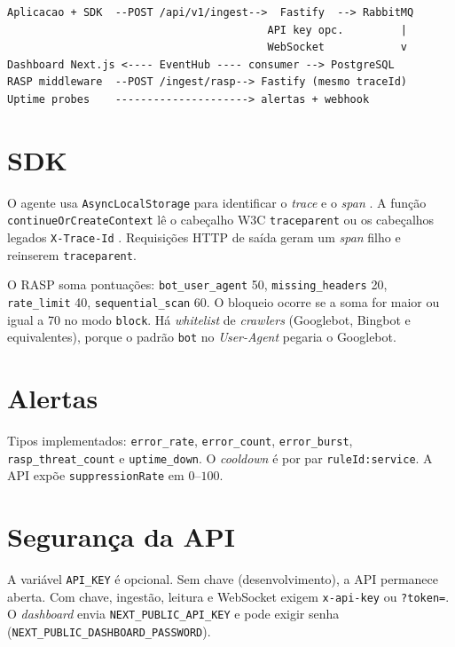 \documentclass[
  12pt,
  oneside,
  a4paper,
  english,
  brazil,
  sumario=tradicional
]{abntex2}
\begin{document}
\begin{lstlisting}[caption={Fluxo de ingestao e correlacao},label={lst:fluxo}]
Aplicacao + SDK  --POST /api/v1/ingest-->  Fastify  --> RabbitMQ
                                         API key opc.         |
                                         WebSocket            v
Dashboard Next.js <---- EventHub ---- consumer --> PostgreSQL
RASP middleware  --POST /ingest/rasp--> Fastify (mesmo traceId)
Uptime probes    ---------------------> alertas + webhook
\end{lstlisting}

\section{SDK}

O agente usa \texttt{AsyncLocalStorage} para identificar o \textit{trace} e o \textit{span} \cite{nodejsAls}. A função \texttt{continueOrCreateContext} lê o cabeçalho W3C \texttt{traceparent} ou os cabeçalhos legados \texttt{X-Trace-Id} \cite{w3c2021tracecontext}. Requisições HTTP de saída geram um \textit{span} filho e reinserem \texttt{traceparent}.

O RASP soma pontuações: \texttt{bot\_user\_agent} 50, \texttt{missing\_headers} 20, \texttt{rate\_limit} 40, \texttt{sequential\_scan} 60. O bloqueio ocorre se a soma for maior ou igual a 70 no modo \texttt{block}. Há \textit{whitelist} de \textit{crawlers} (Googlebot, Bingbot e equivalentes), porque o padrão \texttt{bot} no \textit{User-Agent} pegaria o Googlebot.

\section{Alertas}

Tipos implementados: \texttt{error\_rate}, \texttt{error\_count}, \texttt{error\_burst}, \texttt{rasp\_threat\_count} e \texttt{uptime\_down}. O \textit{cooldown} é por par \texttt{ruleId:service}. A API expõe \texttt{suppressionRate} em $0$--$100$.

\section{Segurança da API}

A variável \texttt{API\_KEY} é opcional. Sem chave (desenvolvimento), a API permanece aberta. Com chave, ingestão, leitura e WebSocket exigem \texttt{x-api-key} ou \texttt{?token=}. O \textit{dashboard} envia \texttt{NEXT\_PUBLIC\_API\_KEY} e pode exigir senha (\texttt{NEXT\_PUBLIC\_DASHBOARD\_PASSWORD}).
\end{document}
